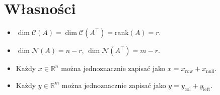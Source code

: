 \documentclass[12pt]{article}
\begin{document}
\section*{Własności}
\begin{itemize}
  \item $\dim \mathcal{C}(A)=\dim \mathcal{C}(A^\top)=\mathrm{rank}(A)=r$.
  \item $\dim \mathcal{N}(A)=n-r$, \quad $\dim \mathcal{N}(A^\top)=m-r$.
  \item Każdy $x\in\mathbb{R}^n$ można jednoznacznie zapisać jako
        $x=x_{\mathrm{row}}+x_{\mathrm{null}}$.
  \item Każdy $y\in\mathbb{R}^m$ można jednoznacznie zapisać jako
        $y=y_{\mathrm{col}}+y_{\mathrm{left}}$.
\end{itemize}
\end{document}
